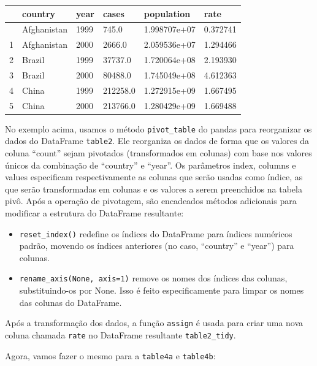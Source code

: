\documentclass[
  portuguese,
  letterpaper,
  DIV=11,
  numbers=noendperiod]{scrreprt}
\providecommand{\tightlist}{%
  \setlength{\itemsep}{0pt}\setlength{\parskip}{0pt}}
\theoremstyle{definition}
\theoremstyle{remark}
\begin{document}
\begin{longtable}[]{@{}llllll@{}}
\toprule\noalign{}
& country & year & cases & population & rate \\
\midrule\noalign{}
\endhead
\bottomrule\noalign{}
\endlastfoot
0 & Afghanistan & 1999 & 745.0 & 1.998707e+07 & 0.372741 \\
1 & Afghanistan & 2000 & 2666.0 & 2.059536e+07 & 1.294466 \\
2 & Brazil & 1999 & 37737.0 & 1.720064e+08 & 2.193930 \\
3 & Brazil & 2000 & 80488.0 & 1.745049e+08 & 4.612363 \\
4 & China & 1999 & 212258.0 & 1.272915e+09 & 1.667495 \\
5 & China & 2000 & 213766.0 & 1.280429e+09 & 1.669488 \\
\end{longtable}

No exemplo acima, usamos o método \texttt{pivot\_table} do pandas para
reorganizar os dados do DataFrame \texttt{table2}. Ele reorganiza os
dados de forma que os valores da coluna ``count'' sejam pivotados
(transformados em colunas) com base nos valores únicos da combinação de
``country'' e ``year''. Os parâmetros index, columns e values
especificam respectivamente as colunas que serão usadas como índice, as
que serão transformadas em colunas e os valores a serem preenchidos na
tabela pivô. Após a operação de pivotagem, são encadeados métodos
adicionais para modificar a estrutura do DataFrame resultante:

\begin{itemize}
\tightlist
\item
  \texttt{reset\_index()} redefine os índices do DataFrame para índices
  numéricos padrão, movendo os índices anteriores (no caso, ``country''
  e ``year'') para colunas.
\item
  \texttt{rename\_axis(None,\ axis=1)} remove os nomes dos índices das
  colunas, substituindo-os por None. Isso é feito especificamente para
  limpar os nomes das colunas do DataFrame.
\end{itemize}

Após a transformação dos dados, a função \texttt{assign} é usada para
criar uma nova coluna chamada \texttt{rate} no DataFrame resultante
\texttt{table2\_tidy}.

Agora, vamos fazer o mesmo para a \texttt{table4a} e \texttt{table4b}:
\end{document}
